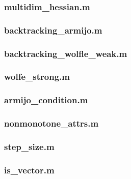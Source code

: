 \documentclass[a4paper,11pt]{article}
\numberwithin{equation}{section} %
\begin{document}


\subsubsection{multidim\_hessian.m}



\subsubsection{backtracking\_armijo.m}



\subsubsection{backtracking\_wolfle\_weak.m}



\subsubsection{wolfe\_strong.m}



\subsubsection{armijo\_condition.m}



\subsubsection{nonmonotone\_attrs.m}



\subsubsection{step\_size.m}



\subsubsection{is\_vector.m}
\end{document}

